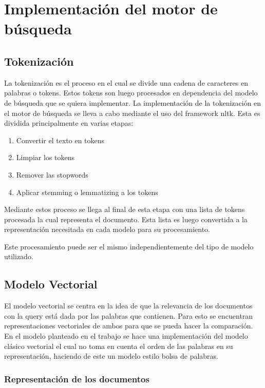 \documentclass[runningheads]{llncs}
\begin{document}
\section{Implementación del motor de búsqueda}

\subsection{Tokenización}

La tokenización es el proceso en el cual se divide una cadena de caracteres en palabras o tokens.
Estos tokens son luego procesados en dependencia del modelo de búsqueda que se quiera implementar.
La implementación de la tokenización en el motor de búsqueda se lleva a cabo mediante el uso del
framework nltk. Esta es dividida principalmente en varias etapas:

\begin{enumerate}
    \item Convertir el texto en tokens
    \item Limpiar los tokens
    \item Remover las stopwords
    \item Aplicar stemming o lemmatizing a los tokens
\end{enumerate}

Mediante estos proceso se llega al final de esta etapa con una lista de tokens procesada la cual
representa el documento. Esta lista es luego convertida a la representación necesitada en cada modelo
para su procesamiento.

Este procesamiento puede ser el mismo independientemente del tipo de modelo utilizado.

\subsection{Modelo Vectorial}

El modelo vectorial se centra en la idea de que la relevancia de los documentos con la query está 
dada por las palabras que contienen. Para esto se encuentran representaciones vectoriales de ambos
para que se pueda hacer la comparación. En el modelo planteado en el trabajo se hace una implementación
del modelo clásico vectorial el cual no toma en cuenta el orden de las palabras en su representación, haciendo
de este un modelo estilo bolsa de palabras.

\subsubsection{Representación de los documentos}
\end{document}

